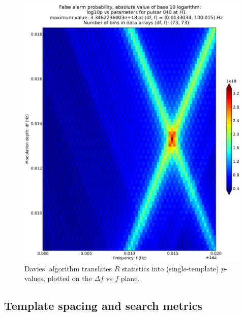 \begin{figure}
\begin{center}
\includegraphics[trim=20 20 20 80, clip, keepaspectratio,height=0.55\paperheight]{plots/Prob-4e21-on-4e24.eps}
\caption{Davies' algorithm translates $R$ statistics into (single-template) $p$-values, plotted on the $\Delta f$ vs $f$ plane.}
\label{inj_log10p}
\end{center}
\end{figure}

\subsection{Template spacing and search metrics}

